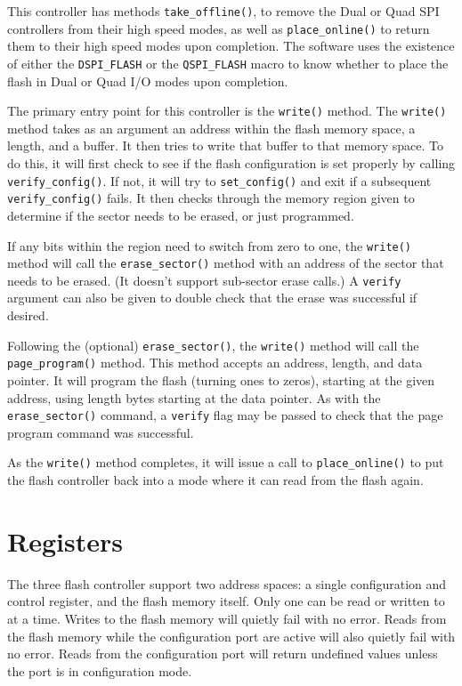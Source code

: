 \documentclass{gqtekspec}
\begin{document}
This controller has methods {\tt take\_offline()}, to remove the Dual or
Quad SPI controllers from their high speed modes, as well as
{\tt place\_online()} to return them to their high speed modes upon completion.
The software uses the existence of either the {\tt DSPI\_FLASH} or the
{\tt QSPI\_FLASH} macro to know whether to place the flash in Dual or Quad
I/O modes upon completion.

The primary entry point for this controller is the {\tt write()} method.
The {\tt write()} method takes as an argument an address within the flash
memory space, a length, and a buffer.  It then tries to write that buffer
to that memory space.  To do this, it will first check to see if the flash
configuration is set properly by calling {\tt verify\_config()}.  If not, it
will try to {\tt set\_config()} and exit if a subsequent {\tt verify\_config()}
fails.  It then checks through the memory region given to determine if the
sector needs to be erased, or just programmed.

If any bits within the region need to switch from zero to one, the
{\tt write()} method will call the {\tt erase\_sector()} method with an
address of the sector that needs to be erased.  (It doesn't support sub-sector
erase calls.)  A {\tt verify} argument can also be given to double check that
the erase was successful if desired.

Following the (optional) {\tt erase\_sector()}, the {\tt write()} method will
call the {\tt page\_program()} method.  This method accepts an address, length,
and data pointer.  It will program the flash (turning ones to zeros), starting
at the given address, using length bytes starting at the data pointer.  As
with the {\tt erase\_sector()} command, a {\tt verify} flag may be passed to
check that the page program command was successful.

As the {\tt write()} method completes, it will issue a call to
{\tt place\_online()} to put the flash controller back into a mode where it
can read from the flash again.

\chapter{Registers}\label{chap:regs}

The three flash controller support two address spaces: a single configuration
and control register, and the flash memory itself.  Only one can be read
or written to at a time.  Writes to the flash memory will quietly fail with
no error.  Reads from the flash memory while the configuration port are active
will also quietly fail with no error.  Reads from the configuration port
will return undefined values unless the port is in configuration mode.
\end{document}
